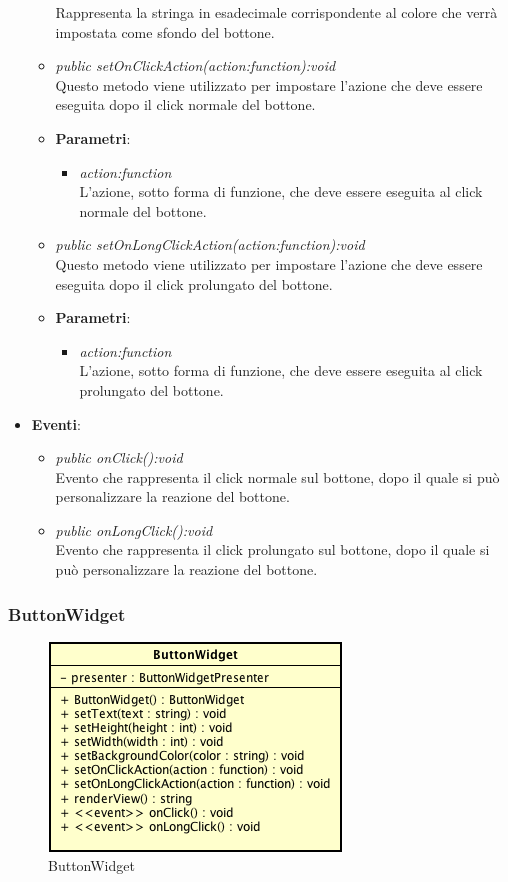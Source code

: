 \begin{itemize}
\begin{itemize}
{\begin{itemize}
		Rappresenta la stringa in esadecimale corrispondente al colore che verrà impostata come sfondo del bottone.
		\end{itemize}}
	\item \textit{public setOnClickAction(action:function):void}\\
	Questo metodo viene utilizzato per impostare l'azione che deve essere eseguita dopo il click normale del bottone.
		\item{\textbf{Parametri}: \begin{itemize}
		\item \textit{action:function}\\
		L'azione, sotto forma di funzione, che deve essere eseguita al click normale del bottone.
		\end{itemize}}
	\item \textit{public setOnLongClickAction(action:function):void}\\
		Questo metodo viene utilizzato per impostare l'azione che deve essere eseguita dopo il click prolungato del bottone.
		\item{\textbf{Parametri}: \begin{itemize}
		\item \textit{action:function}\\
		L'azione, sotto forma di funzione, che deve essere eseguita al click prolungato del bottone.
		\end{itemize}}
	\end{itemize}
\item \textbf{Eventi}:
	\begin{itemize}
	\item \textit{public onClick():void}\\
	Evento che rappresenta il click normale sul bottone, dopo il quale si può personalizzare la reazione del bottone.
	\item \textit{public onLongClick():void}\\
	Evento che rappresenta il click prolungato sul bottone, dopo il quale si può personalizzare la reazione del bottone.
	\end{itemize}
\end{itemize}

\subsubsection{ButtonWidget}

\label{ButtonWidget}
\begin{figure}[ht]
	\centering
	\includegraphics[scale=0.5]{Sezioni/SottosezioniST/img/ButtonWidget.png}
	\caption{ButtonWidget}
\end{figure}

